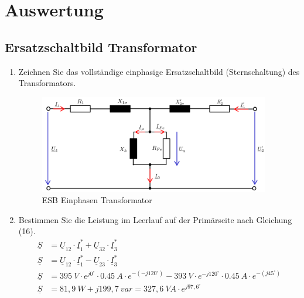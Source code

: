 \section{Auswertung}
\subsection{Ersatzschaltbild Transformator}
\begin{enumerate}[label=\alph*)]
	\item Zeichnen Sie das vollständige einphasige Ersatzschaltbild (Sternschaltung) des
	      Transformators.
	      \begin{figure}[h!]
		      \begin{center}
			      \includegraphics[width=0.95\textwidth]{img/4.1.1.1}
		      \end{center}
		      \caption{ESB Einphasen Transformator}\label{img:4.1.1.1}
	      \end{figure}

	\item Bestimmen Sie die Leistung im Leerlauf auf der Primärseite nach Gleichung (16).
	      \begin{align*}
		      \underline S & = \underline U_{12} \cdot \underline I_1^* + \underline U_{32}\cdot \underline I_3^* \\
		      \underline S & = \underline U_{12} \cdot \underline I_1^* - \underline U_{23}\cdot \underline I_3^* \\
		      \underline S & = 395\ V \cdot e^{j0^\circ} \cdot 0.45\ A \cdot e^{-(-j120^\circ)} -
		      393\ V \cdot e^{-j120^\circ}\cdot 0.45\ A \cdot e^{-(j45^\circ)}                                    \\
		      \underline S & = 81,9\ W + j199,7\ var = 327,6\ VA\cdot e^{j97,6^\circ}
	      \end{align*}


\end{enumerate}
